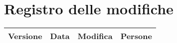 \section{Registro delle modifiche}

%
%
%

\begin{center}
    \begin{tabularx}{\linewidth}{|l|l|X|X|}            
        \hline
        \textbf{Versione} & \textbf{Data} & \textbf{Modifica}& \textbf{Persone}\\
        \hline

    \end{tabularx}
\end{center}